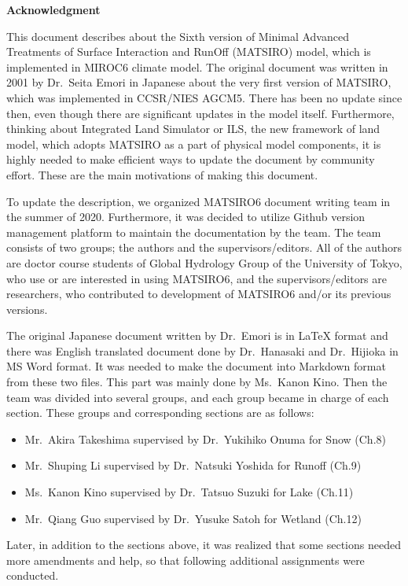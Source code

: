 \textbf{Acknowledgment}

This document describes about the Sixth version of Minimal Advanced Treatments of Surface Interaction and RunOff (MATSIRO) model, which is implemented in MIROC6 climate model. The original document
was written in 2001 by Dr.~Seita Emori in Japanese about the very first version of MATSIRO, which was implemented in CCSR/NIES AGCM5. There has been no update since then, even though there are
significant updates in the model itself. Furthermore, thinking about Integrated Land Simulator or ILS, the new framework of land model, which adopts MATSIRO as a part of physical model components, it
is highly needed to make efficient ways to update the document by community effort. These are the main motivations of making this document.

To update the description, we organized MATSIRO6 document writing team in the summer of 2020. Furthermore, it was decided to utilize Github version management platform to maintain the documentation by
the team. The team consists of two groups; the authors and the supervisors/editors. All of the authors are doctor course students of Global Hydrology Group of the University of Tokyo, who use or are
interested in using MATSIRO6, and the supervisors/editors are researchers, who contributed to development of MATSIRO6 and/or its previous versions.

The original Japanese document written by Dr.~Emori is in LaTeX format and there was English translated document done by Dr.~Hanasaki and Dr.~Hijioka in MS Word format. It was needed to make the
document into Markdown format from these two files. This part was mainly done by Ms.~Kanon Kino. Then the team was divided into several groups, and each group became in charge of each section. These
groups and corresponding sections are as follows:

\begin{itemize}
\item
  Mr.~Akira Takeshima supervised by Dr.~Yukihiko Onuma for Snow (Ch.8)
\item
  Mr.~Shuping Li supervised by Dr.~Natsuki Yoshida for Runoff (Ch.9)
\item
  Ms.~Kanon Kino supervised by Dr.~Tatsuo Suzuki for Lake (Ch.11)
\item
  Mr.~Qiang Guo supervised by Dr.~Yusuke Satoh for Wetland (Ch.12)
\end{itemize}

Later, in addition to the sections above, it was realized that some sections needed more amendments and help, so that following additional assignments were conducted.

